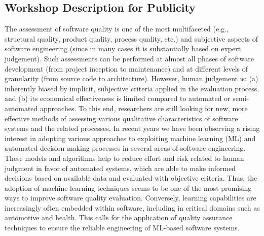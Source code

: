 \subsection{Workshop Description for Publicity}
The assessment of software quality is one of the most multifaceted (e.g., structural quality, product quality, process quality, etc.) and subjective aspects of software engineering (since in many cases it is substantially based on expert judgement).
    Such assessments can be performed at almost all phases of software development (from project inception to maintenance) and at different levels of granularity (from source code to architecture). However, human judgement is: (a) inherently biased by implicit, subjective criteria applied in the evaluation process, and (b) its economical effectiveness is limited compared to automated or semi-automated approaches.
    To this end, researchers are still looking for new, more effective methods of assessing various qualitative characteristics of software systems and the related processes.
    In recent years we have been observing a rising interest in adopting various approaches to exploiting machine learning (ML) and automated decision-making processes in several areas of software engineering. These models and algorithms help to reduce effort and risk related to human judgment in favor of automated systems, which are able to make informed decisions based on available data and evaluated with objective criteria.
    Thus, the adoption of machine learning techniques seems to be one of the most promising ways to improve software quality evaluation.
    Conversely, learning capabilities are increasingly often embedded within software, including in critical domains such as automotive and health.
    This calls for the application of quality assurance techniques to ensure the reliable engineering of ML-based software systems.